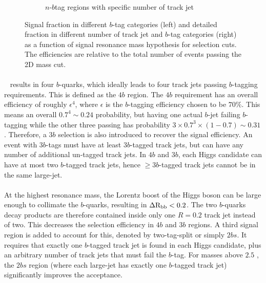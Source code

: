 \begin{figure}[htbp!]
\begin{subfigure}[b]{0.45\textwidth}
        \caption{$n$-$b$tag regions with specific number of track jet}
        \label{fig:boosted-nbjet-signal-efficiency-detail}
    \end{subfigure}
  \caption{Signal fraction in different $b$-tag categories (left) and detailed fraction in different number of track jet and $b$-tag categories (right) as a function of signal resonance mass hypothesis for selection cuts. The efficiencies are relative to the total number of events passing the 2D mass cut.}
  \label{fig:boosted-nbjet-signal-efficiency}
\end{figure}

\paragraph{}
\Xtohhb~ results in four $b$-quarks, which ideally leads to four track jets passing $b$-tagging requirements.
This is defined as the $4b$ region.
The $4b$ requirement has an overall efficiency of roughly $\epsilon^4$, where $\epsilon$ is the $b$-tagging efficiency chosen to be $70\%$.
This means an overall $0.7^4 \sim 0.24$ probability, but having one actual $b$-jet failing $b$-tagging while the other three passing has probability $3 \times 0.7^3 \times (1-0.7) \sim 0.31$.
Therefore, a $3b$ selection is also introduced to recover the signal efficiency. 
An event with $3b$-tags must have at least $3b$-tagged track jets, but can have any number of additional un-tagged track jets.
In $4b$ and $3b$, each Higgs candidate can have at most two $b$-tagged track jets, hence $\geq 3b$-tagged track jets cannot be in the same large-\R jet.

\paragraph{}
At the highest resonance mass, the Lorentz boost of the Higgs boson can be large enough to collimate the $b$-quarks, resulting in $\rm \Delta R_{bb} < 0.2$.
The two $b$-quarks decay products are therefore contained inside only one $R = 0.2$ track jet instead of two.
This decreases the selection efficiency in $4b$ and $3b$ regions.
A third signal region is added to account for this, denoted by two-tag-split or simply $2bs$.
It requires that exactly one $b$-tagged track jet is found in each Higgs candidate, plus an arbitrary number of track jets that must fail the $b$-tag.
For masses above $2.5$ \TeV, the $2bs$ region (where each large-\R jet has exactly one $b$-tagged track jet) significantly improves the acceptance.

